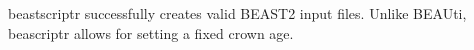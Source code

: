 \documentclass{article}
\begin{document}
beastscriptr successfully creates valid BEAST2 input files. Unlike BEAUti,
beascriptr allows for setting a fixed crown age.



%
%
%
%
%

%



\begin{thebibliography}{}

\end{thebibliography}
\end{document}
